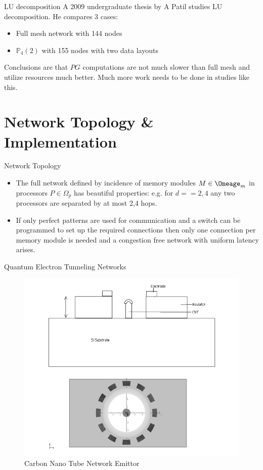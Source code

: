 \documentclass{beamer}
\begin{document}
\begin{frame}{LU decomposition}
A 2009 undergraduate thesis by A Patil studies LU decomposition. He compares 3 cases:
\begin{itemize}
\item Full mesh network with 144 nodes
\item $\mathbb{P}_4(2)$ with 155 nodes with two data layouts
\end{itemize}

Conclusions are that $PG$ computations are not much slower than full mesh and utilize resources much better.  Much more work needs to be done in studies like this.

\end{frame}


\section{Network Topology \& Implementation}

\begin{frame}{Network Topology}

\begin{itemize}
\item The full network defined by incidence of memory modules $M\in\Omeage_m$ in processors $P\in\Omega_p$ has beautiful properties: e.g. for $d==2,4$ any two processors are separated by at most 2,4 hops.
\item If only perfect patterns are used for communication and a switch can be programmed to set up the required connections then only one connection per memory module is needed and a congestion free network with uniform latency arises.
\end{itemize}

\end{frame}

\begin{frame}{Quantum Electron Tunneling Networks}
\begin{figure}
\includegraphics[scale=0.2]{nanocb-nic.png}
\caption{Carbon Nano Tube Network Emittor}
\end{figure}
\end{frame}
\end{document}
